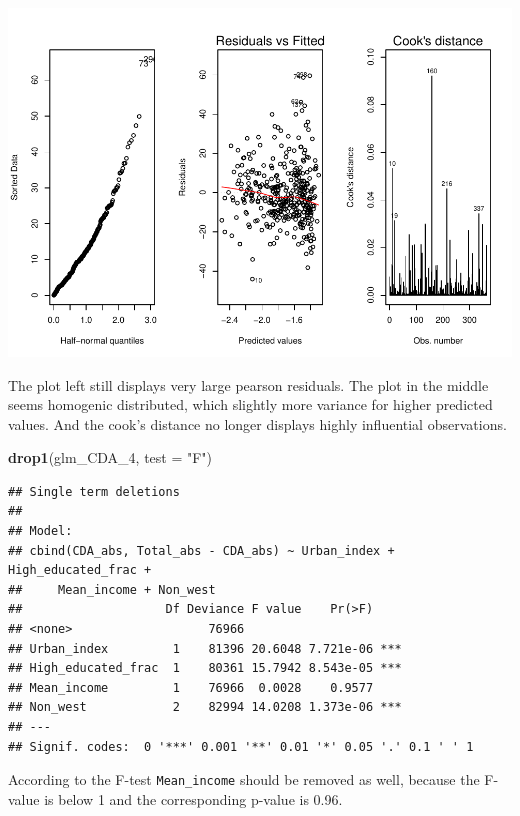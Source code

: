 \documentclass[11pt,]{article}
\newenvironment{Shaded}{\begin{snugshade}}{\end{snugshade}}
\newcommand{\KeywordTok}[1]{\textcolor[rgb]{0.13,0.29,0.53}{\textbf{#1}}}
\newcommand{\DataTypeTok}[1]{\textcolor[rgb]{0.13,0.29,0.53}{#1}}
\newcommand{\DecValTok}[1]{\textcolor[rgb]{0.00,0.00,0.81}{#1}}
\newcommand{\StringTok}[1]{\textcolor[rgb]{0.31,0.60,0.02}{#1}}
\newcommand{\NormalTok}[1]{#1}
\begin{document}
\begin{center}\includegraphics{Report_files/figure-latex/unnamed-chunk-22-1} \end{center}

The plot left still displays very large pearson residuals. The plot in
the middle seems homogenic distributed, which slightly more variance for
higher predicted values. And the cook's distance no longer displays
highly influential observations.

\begin{Shaded}
\begin{Highlighting}[]
\KeywordTok{drop1}\NormalTok{(glm_CDA_}\DecValTok{4}\NormalTok{, }\DataTypeTok{test =} \StringTok{"F"}\NormalTok{)}
\end{Highlighting}
\end{Shaded}

\begin{verbatim}
## Single term deletions
## 
## Model:
## cbind(CDA_abs, Total_abs - CDA_abs) ~ Urban_index + High_educated_frac + 
##     Mean_income + Non_west
##                    Df Deviance F value    Pr(>F)    
## <none>                   76966                      
## Urban_index         1    81396 20.6048 7.721e-06 ***
## High_educated_frac  1    80361 15.7942 8.543e-05 ***
## Mean_income         1    76966  0.0028    0.9577    
## Non_west            2    82994 14.0208 1.373e-06 ***
## ---
## Signif. codes:  0 '***' 0.001 '**' 0.01 '*' 0.05 '.' 0.1 ' ' 1
\end{verbatim}

According to the F-test \texttt{Mean\_income} should be removed as well,
because the F-value is below 1 and the corresponding p-value is 0.96.
\end{document}
